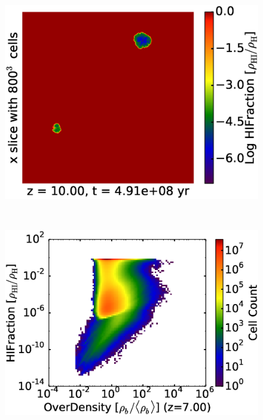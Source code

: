 \begin{figure}[!tp]
	\begin{minipage}[h]{0.33\linewidth}
	\centering
	\includegraphics[trim = 10mm 0mm 7mm 7mm, clip, width=1.0\textwidth]{1_3_slice_HIFraction_x_RD0029.eps}
	\end{minipage}
\vspace*{-2.00mm}\\
	\begin{minipage}[h]{0.33\linewidth}
	\centering
	\includegraphics[trim = 7mm 9mm 1mm 7mm, clip, width=1.0\textwidth]{2_1_HD7900OverDensityHIFraction.eps}
	\end{minipage}
\hspace*{-2.00mm}
	\begin{minipage}[h]{0.33\linewidth}
	\centering

\end{minipage}
\end{figure}
